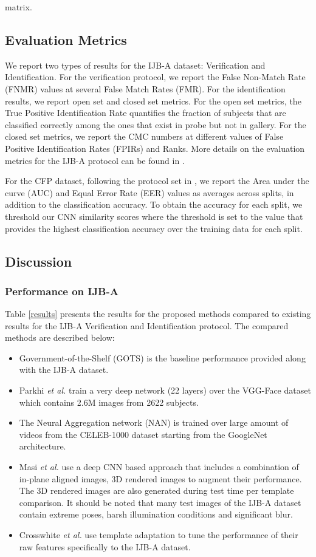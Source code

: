\documentclass[10pt,twocolumn,letterpaper]{article}
\begin{document}
matrix.
\subsection{Evaluation Metrics}
We report two types of results for the IJB-A dataset: Verification and
Identification. For the verification protocol, we report the False Non-Match
Rate (FNMR) values at several False Match Rates (FMR). For the identification
results, we report open set and closed set metrics. For the open set metrics, the True Positive
Identification Rate quantifies the fraction of subjects that are classified
correctly among the ones that exist in probe but not in gallery. For the closed
set metrics, we report the CMC numbers at different values of False Positive
Identification Rates (FPIRs) and Ranks. More details on the evaluation
metrics for the IJB-A protocol can be found in \cite{ijba15}. 

For the CFP dataset, following the protocol set in \cite{cfpw}, we report the
Area under the curve (AUC) and Equal Error Rate (EER) values as averages across
splits, in addition to the classification accuracy. To obtain the accuracy for
each split, we threshold our CNN similarity scores where the threshold is set to
the value that provides the highest classification accuracy over the training data
for each split.


\subsection{Discussion}
\subsubsection*{Performance on IJB-A}
Table \ref{results} presents the results for the proposed methods compared to
existing results for the IJB-A Verification and Identification protocol. The
compared methods are described below:
\begin{itemize}[leftmargin=*]
\item Government-of-the-Shelf (GOTS) \cite{ijba15} is the baseline performance
  provided along with the IJB-A dataset.
\item Parkhi \emph{et al.} \cite{parkhi15} train a very deep network (22 layers) over the VGG-Face dataset which contains 2.6M images from 2622 subjects.
\item The Neural Aggregation network (NAN) \cite{nan} is trained over large
  amount of videos from the CELEB-1000 dataset \cite{celeb1000} starting from the GoogleNet \cite{gnet} architecture.
\item Masi \emph{et al.} \cite{isi3d} use a deep CNN based approach that includes a combination of in-plane aligned images, 3D rendered images to augment their performance. The 3D rendered images are also generated during test time per template comparison. It should be noted that many test images of the IJB-A dataset contain extreme poses, harsh illumination conditions and significant blur. 
\item Crosswhite \emph{et al.} use template adaptation \cite{wolf} to tune the performance of their raw features specifically to the IJB-A dataset.
\end{itemize} 
\vspace{2mm}
\end{document}
